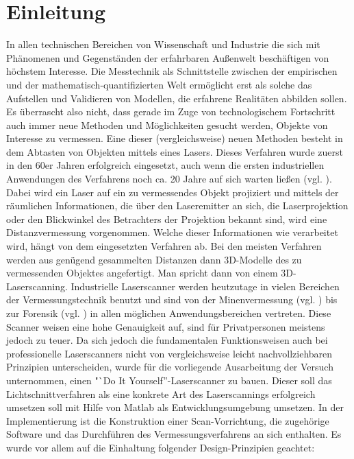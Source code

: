\chapter{Einleitung}
In allen technischen Bereichen von Wissenschaft und Industrie die sich mit Phänomenen und Gegenständen der erfahrbaren Außenwelt beschäftigen von höchstem Interesse. Die Messtechnik als Schnittstelle zwischen der empirischen und der mathematisch-quantifizierten Welt ermöglicht erst als solche das Aufstellen und Validieren von Modellen, die erfahrene Realitäten abbilden sollen. Es überrascht also nicht, dass gerade im Zuge von technologischem Fortschritt auch immer neue Methoden und Möglichkeiten gesucht werden, Objekte von Interesse zu vermessen. \newline
Eine dieser (vergleichsweise) neuen Methoden besteht in dem Abtasten von Objekten mittels eines Lasers. Dieses Verfahren wurde zuerst in den 60er Jahren erfolgreich eingesetzt, auch wenn die ersten industriellen Anwendungen des Verfahrens noch ca. 20 Jahre auf sich warten ließen (vgl. \cite{Ebrahim:11}). Dabei wird ein Laser auf ein zu vermessendes Objekt projiziert und mittels der räumlichen Informationen, die über den Laseremitter an sich, die Laserprojektion oder den Blickwinkel des Betrachters der Projektion bekannt sind, wird eine Distanzvermessung vorgenommen. Welche dieser Informationen wie verarbeitet wird, hängt von dem eingesetzten Verfahren ab. Bei den meisten Verfahren werden aus genügend gesammelten Distanzen dann 3D-Modelle des zu vermessenden Objektes angefertigt. Man spricht dann von einem 3D-Laserscanning. \newline
Industrielle Laserscanner werden heutzutage in vielen Bereichen der Vermessungstechnik benutzt und sind von der Minenvermessung (vgl. \cite{riegl:17}) bis zur Forensik (vgl. \cite{Zoller:16}) in allen möglichen Anwendungsbereichen vertreten. Diese Scanner weisen eine hohe Genauigkeit auf, sind für Privatpersonen meistens jedoch zu teuer. Da sich jedoch die fundamentalen Funktionsweisen auch bei professionelle Laserscanners nicht von vergleichsweise leicht nachvollziehbaren Prinzipien unterscheiden, wurde für die vorliegende Ausarbeitung der Versuch unternommen, einen "`Do It Yourself''-Laserscanner zu bauen. Dieser soll das Lichtschnittverfahren als eine konkrete Art des Laserscannings erfolgreich umsetzen soll mit Hilfe von Matlab als Entwicklungsumgebung umsetzen. In der Implementierung ist die Konstruktion einer Scan-Vorrichtung, die zugehörige Software und das Durchführen des Vermessungsverfahrens an sich enthalten. Es wurde vor allem auf die Einhaltung folgender Design-Prinzipien geachtet:
